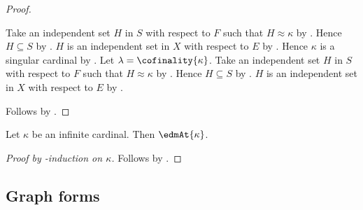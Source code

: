 \begin{proof}
\begin{subproof}
\begin{byCase}
\begin{byCase}
                        \begin{byCase}
                                Take an independent set $H$ in $S$ with
                                    respect to $F$ such that $H\approx\kappa$ by
                                    .
                                Hence $H\subseteq S$ by
                                    .
                                $H$ is an independent set in $X$ with
                                    respect to $E$ by
                                    .
                                Hence $\kappa$ is a singular cardinal by
                                    .
                                Let $\lambda=\cofinality{\kappa}$.
                                Take an independent set $H$ in $S$ with
                                    respect to $F$ such that $H\approx\kappa$ by
                                    .
                                Hence $H\subseteq S$ by
                                    .
                                $H$ is an independent set in $X$ with
                                    respect to $E$ by
                                    .
                        \end{byCase}
                \end{byCase}
        \end{byCase}
    \end{subproof}
    Follows by .
\end{proof}

\begin{theorem}\label{erdos_dushnik_miller_cardinal}
    Let $\kappa$ be an infinite cardinal.
    Then $\edmAt{\kappa}$.
\end{theorem}
\begin{proof}[Proof by \in-induction on $\kappa$]
    Follows by .
\end{proof}

\subsection{Graph forms}

